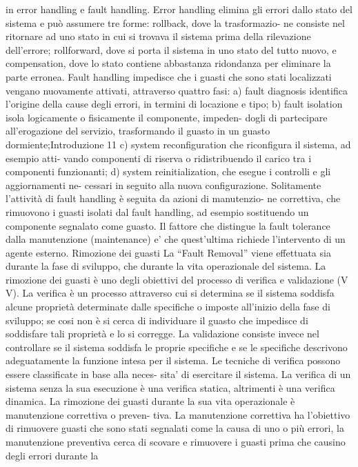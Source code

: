 \documentclass[14pt]{extarticle}
\begin{document}
in error handling e fault handling. Error handling elimina gli errori dallo
stato del sistema e può assumere tre forme: rollback, dove la trasformazio-
ne consiste nel ritornare ad uno stato in cui si trovava il sistema prima della
rilevazione dell’errore; rollforward, dove si porta il sistema in uno stato del
tutto nuovo, e compensation, dove lo stato contiene abbastanza ridondanza
per eliminare la parte erronea. Fault handling impedisce che i guasti che sono
stati localizzati vengano nuovamente attivati, attraverso quattro fasi:
a) fault diagnosis identifica l’origine della cause degli errori, in termini di
locazione e tipo;
b) fault isolation isola logicamente o fisicamente il componente, impeden-
dogli di partecipare all’erogazione del servizio, trasformando il guasto in
un guasto dormiente;Introduzione
11
c) system reconfiguration che riconfigura il sistema, ad esempio atti-
vando componenti di riserva o ridistribuendo il carico tra i componenti
funzionanti;
d) system reinitialization, che esegue i controlli e gli aggiornamenti ne-
cessari in seguito alla nuova configurazione.
Solitamente l’attività di fault handling è seguita da azioni di manutenzio-
ne correttiva, che rimuovono i guasti isolati dal fault handling, ad esempio
sostituendo un componente segnalato come guasto. Il fattore che distingue la
fault tolerance dalla manutenzione (maintenance) e’ che quest’ultima richiede
l’intervento di un agente esterno.
Rimozione dei guasti
La “Fault Removal” viene effettuata sia durante la fase di sviluppo, che durante la vita operazionale del sistema.
La rimozione dei guasti è uno degli obiettivi del processo di verifica e validazione (V V).
La verifica è un processo attraverso cui si determina se il sistema soddisfa alcune proprietà determinate dalle
specifiche o imposte all’inizio della fase di sviluppo; se cosi non è si cerca di
individuare il guasto che impedisce di soddisfare tali proprietà e lo si corregge.
La validazione consiste invece nel controllare se il sistema soddisfa le proprie
specifiche e se le specifiche descrivono adeguatamente la funzione intesa per il
sistema. Le tecniche di verifica possono essere classificate in base alla neces-
sita’ di esercitare il sistema. La verifica di un sistema senza la sua esecuzione
è una verifica statica, altrimenti è una verifica dinamica. La rimozione dei
guasti durante la sua vita operazionale è manutenzione correttiva o preven-
tiva. La manutenzione correttiva ha l’obiettivo di rimuovere guasti che sono
stati segnalati come la causa di uno o più errori, la manutenzione preventiva
cerca di scovare e rimuovere i guasti prima che causino degli errori durante la
\end{document}
